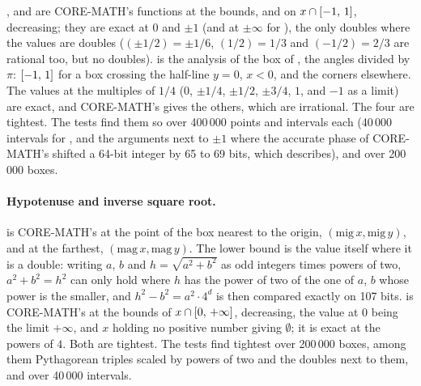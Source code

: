,  and  are CORE-MATH's
functions at the bounds,  and  on
$x\cap[-1,\,1]$,  decreasing; they are exact at $0$ and
$\pm1$ (and at $\pm\infty$ for ), the only doubles where the
values are doubles ($(\pm1/2)=\pm1/6$, $(1/2)=1/3$ and $(-1/2)=2/3$ are rational too, but no doubles).\newinvfive{}  is the analysis of
the box of , the angles divided by $\pi$: $[-1,\,1]$ for a
box crossing the half-line $y=0$, $x<0$, and the corners elsewhere. The
values at the multiples of $1/4$ ($0$, $\pm1/4$, $\pm1/2$, $\pm3/4$, $1$,
and $-1$ as a limit) are exact, and CORE-MATH's  gives the
others, which are irrational.\newinvfive{} The four are tightest. The
tests find them so over 400\,000 points and intervals each (40\,000
intervals for , and the arguments next to $\pm1$ where the accurate phase of
CORE-MATH's  shifted a 64-bit integer by 65 to 69 bits, which  describes),
and  over 200\,000 boxes.

\paragraph{Hypotenuse and inverse square root.}
 is CORE-MATH's  at the point of the box
nearest to the origin, $(\mathrm{mig}\,x, \mathrm{mig}\,y)$, and at the
farthest, $(\mathrm{mag}\,x, \mathrm{mag}\,y)$. The lower bound is the
value itself where it is a double: writing $a$, $b$ and $h=\sqrt{a^2+b^2}$
as odd integers times powers of two, $a^2+b^2=h^2$ can only hold where $h$
has the power of two of the one of $a$, $b$ whose power is the smaller, and $h^2-b^2=a^2\cdot4^d$
is then compared exactly on 107 bits.\newinvfive{}  is
CORE-MATH's  at the bounds of $x\cap[0,\,+\infty]$,
decreasing, the value at $0$ being the limit $+\infty$, and $x$ holding no
positive number giving $\emptyset$; it is exact at the powers of
$4$.\newinvfive{} Both are tightest. The tests find  tightest
over 200\,000 boxes, among them Pythagorean triples scaled by powers of two
and the doubles next to them, and  over 40\,000 intervals.

